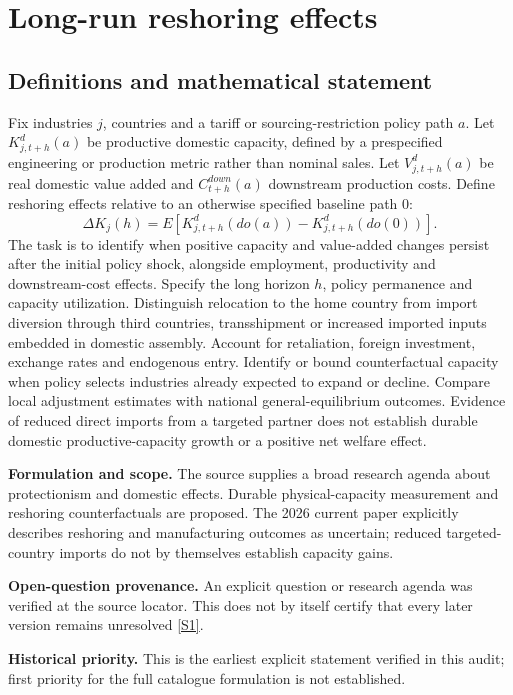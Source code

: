 \documentclass[11pt]{article}
\newcommand{\sref}[2]{\hyperlink{source:#1:#2}{[S#2]}}
\begin{document}
\section*{Long-run reshoring effects}\label{30007625}
\subsection{Definitions and mathematical statement}
Fix industries \(j\), countries and a tariff or sourcing-restriction policy path \(a\). Let \(K^d_{j,t+h}(a)\) be productive domestic capacity, defined by a prespecified engineering or production metric rather than nominal sales. Let \(V^d_{j,t+h}(a)\) be real domestic value added and \(C^{down}_{t+h}(a)\) downstream production costs. Define reshoring effects relative to an otherwise specified baseline path \(0\):
\[\Delta K_j(h)=E[K^d_{j,t+h}(do(a))-K^d_{j,t+h}(do(0))].\]
The task is to identify when positive capacity and value-added changes persist after the initial policy shock, alongside employment, productivity and downstream-cost effects. Specify the long horizon \(h\), policy permanence and capacity utilization. Distinguish relocation to the home country from import diversion through third countries, transshipment or increased imported inputs embedded in domestic assembly. Account for retaliation, foreign investment, exchange rates and endogenous entry. Identify or bound counterfactual capacity when policy selects industries already expected to expand or decline. Compare local adjustment estimates with national general-equilibrium outcomes. Evidence of reduced direct imports from a targeted partner does not establish durable domestic productive-capacity growth or a positive net welfare effect.

\par\textbf{Formulation and scope.} The source supplies a broad research agenda about protectionism and domestic effects. Durable physical-capacity measurement and reshoring counterfactuals are proposed. The 2026 current paper explicitly describes reshoring and manufacturing outcomes as uncertain; reduced targeted-country imports do not by themselves establish capacity gains.

\par\textbf{Open-question provenance.} An explicit question or research agenda was verified at the source locator. This does not by itself certify that every later version remains unresolved \sref{30007625}{1}.

\par\textbf{Historical priority.} This is the earliest explicit statement verified in this audit; first priority for the full catalogue formulation is not established.
\end{document}

